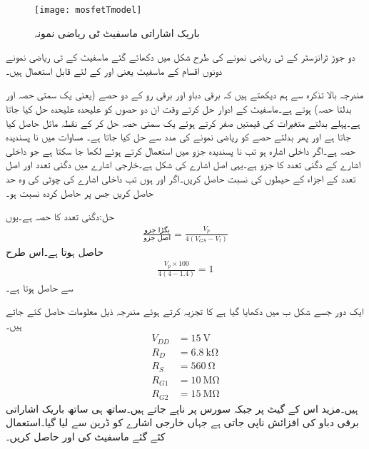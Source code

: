 %
\begin{figure}
\centering
\texttt{[image: mosfetTmodel]}
\caption{باریک اشاراتی ماسفیٹ ٹی ریاضی نمونہ}
\label{شکل_ماسفیٹ_ٹی_ماڈل}
\end{figure}

دو جوڑ ٹرانزسٹر کے ٹی ریاضی نمونے کی طرح  شکل  میں دکھائے گئے ماسفیٹ کے ٹی ریاضی نمونے دونوں اقسام کے ماسفیٹ یعنی  اور  کے لئے قابل استعمال ہیں۔
 

مندرجہ بالا تذکرہ سے ہم دیکھتے ہیں کہ برقی دباو اور برقی رو کے دو حصے (یعنی یک سمتی حصہ اور بدلتا حصہ) ہوتے ہے۔ماسفیٹ کے ادوار حل کرتے وقت ان دو حصوں کو علیحدہ علیحدہ حل کیا جاتا ہے۔پہلے بدلتے متغیرات کی قیمتیں صفر کرتے ہوئے یک سمتی حصہ حل کر کے نقطہ مائل حاصل کیا جاتا ہے اور پھر بدلتے حصے کو ریاضی نمونے کی مدد سے حل کیا جاتا ہے۔
مساوات  میں  نا پسندیدہ حصہ ہے۔اگر داخلی اشارہ  ہو تب نا پسندیدہ جزو میں  استعمال کرتے ہوئے   لکھا جا سکتا ہے جو داخلی اشارے کے دگنی تعدد کا جزو  ہے۔یہی اصل اشارے کی شکل  ہے۔خارجی اشارے میں دگنی تعدد اور اصل تعدد کے اجزاء کے حیطوں کی نسبت حاصل کریں۔اگر  اور  ہوں تب داخلی اشارے کی چوٹی کی وہ حد حاصل کریں جس پر حاصل کردہ نسبت  ہو۔

حل:دگنی تعدد کا حصہ  ہے۔یوں
\begin{align*}
\frac{\textrm{بگڑا جزو}}{\textrm{اصل جزو}}=\frac{V_p}{4 \left(V_{GS}-V_t \right)}
\end{align*}
حاصل ہوتا ہے۔اس طرح
\begin{align*}
\frac{V_p \times 100}{4 \left(4-1.4\right)}=1
\end{align*}
سے   حاصل ہوتا ہے۔

ایک دور جسے شکل  ب میں دکھایا گیا ہے کا تجزیہ کرتے ہوئے مندرجہ ذیل معلومات حاصل کئے جاتے ہیں۔
\begin{align*}
V_{DD}&=\SI{15}{\volt}\\
R_D&=\SI{6.8}{\kilo \ohm}\\
R_S&=\SI{560}{\ohm}\\
R_{G1}&=\SI{10}{\mega \ohm}\\
R_{G2}&=\SI{15}{\mega\ohm}
\end{align*}
ہیں۔مزید اس کے گیٹ پر  جبکہ سورس پر  ناپے جاتے ہیں۔ساتھ ہی ساتھ باریک اشاراتی برقی دباو کی افزائش  ناپی جاتی ہے جہاں خارجی اشارے کو ڈرین سے لیا گیا۔استعمال کئے گئے ماسفیٹ کی  اور  حاصل کریں۔

